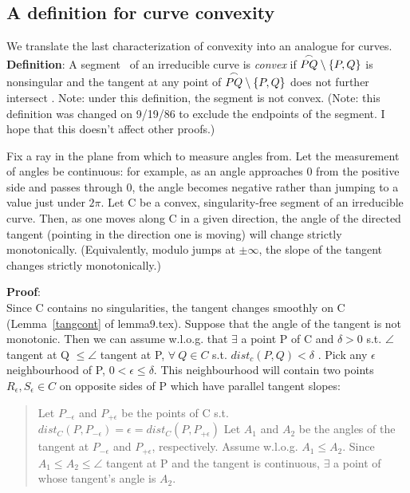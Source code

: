 \subsection{A definition for curve convexity}
We translate the last characterization of convexity into an analogue
for curves.\vspace{.25in} \\
{\bf Definition}: A segment \pq\ of an irreducible curve is {\em convex} if 
$\mbox{$\stackrel{\frown}{PQ}$} \setminus \{P,Q\}$ is nonsingular and the 
tangent at any point of
$\mbox{$\stackrel{\frown}{PQ}$} \setminus \{P,Q\}$ does not further intersect \pq.
Note: under this definition, the segment 
is not convex.
(Note: this definition was changed on 9/19/86 to exclude the endpoints of 
the segment.  I hope that this doesn't affect other proofs.)
\begin{lemma}\nopagebreak
\label{mono}
Fix a ray in the plane from which to measure angles from.  Let
the measurement of angles be continuous: for example, as an angle
approaches 0 from the positive side and passes through 0, the angle becomes 
negative rather than jumping to a value just under $2\pi$.
Let C be a convex, singularity-free segment of an irreducible curve.
Then, as one moves along C in a given direction, the angle of the 
directed tangent (pointing in the direction one is moving) will change 
strictly monotonically.  (Equivalently, modulo jumps at $\pm\infty$, the
slope of the tangent changes strictly monotonically.)
\end{lemma}
{\bf Proof}:\nopagebreak\\
Since C contains no singularities, the tangent changes smoothly on C
(Lemma~\ref{tangcont} of lemma9.tex).
Suppose that the angle of the tangent is not monotonic.
Then we can assume w.l.o.g. that $\exists$ a point P of C and 
$\delta > 0$ s.t. 
$\angle$ tangent at Q $\leq \angle$ tangent at P, $\forall\ Q \in C$
   s.t. $dist_{c}(P,Q) < \delta$ .
Pick any $\epsilon$ neighbourhood of P, $0< \epsilon \leq \delta$.
This neighbourhood will contain two points $R_{\epsilon},S_{\epsilon}
\in C$ on opposite sides of P which have parallel tangent slopes:
\begin{quote}
	Let $P_{-\epsilon}$ and $P_{+\epsilon}$ be the points of C s.t. 
	\mbox{$dist_{C}(P,P_{-\epsilon})=\epsilon=dist_{C}(P,P_{+\epsilon})$}
	Let $A_{1}$ and $A_{2}$ be the angles of the tangent 
        at $P_{-\epsilon}$
	and $P_{+\epsilon}$, respectively. Assume w.l.o.g. $A_{1} \leq A_{2}$.
	Since $A_{1} \leq A_{2} \leq \angle$ tangent at P and the tangent
	is continuous, $\exists$ a point of  
        whose tangent's
	angle is $A_{2}$.
\end{quote}
